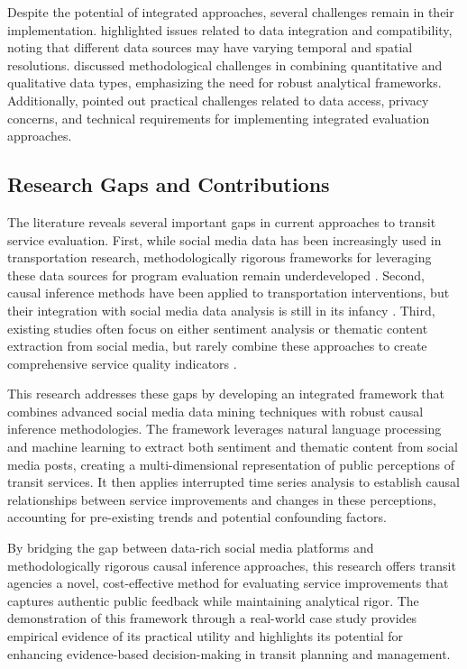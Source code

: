 \documentclass[a4paper,fleqn,12pt]{cas-sc}
\begin{document}
Despite the potential of integrated approaches, several challenges remain in their implementation. \cite{tse2018social} highlighted issues related to data integration and compatibility, noting that different data sources may have varying temporal and spatial resolutions. \cite{nguyen2016transportation} discussed methodological challenges in combining quantitative and qualitative data types, emphasizing the need for robust analytical frameworks. Additionally, \cite{zhang2019examining} pointed out practical challenges related to data access, privacy concerns, and technical requirements for implementing integrated evaluation approaches.

\subsection{Research Gaps and Contributions}
The literature reveals several important gaps in current approaches to transit service evaluation. First, while social media data has been increasingly used in transportation research, methodologically rigorous frameworks for leveraging these data sources for program evaluation remain underdeveloped \citep{schweitzer2012social, zhang2019examining}. Second, causal inference methods have been applied to transportation interventions, but their integration with social media data analysis is still in its infancy \citep{hong2020causal, ye2020causal}. Third, existing studies often focus on either sentiment analysis or thematic content extraction from social media, but rarely combine these approaches to create comprehensive service quality indicators \citep{collins2013social, luong2015mining}.

This research addresses these gaps by developing an integrated framework that combines advanced social media data mining techniques with robust causal inference methodologies. The framework leverages natural language processing and machine learning to extract both sentiment and thematic content from social media posts, creating a multi-dimensional representation of public perceptions of transit services. It then applies interrupted time series analysis to establish causal relationships between service improvements and changes in these perceptions, accounting for pre-existing trends and potential confounding factors.

By bridging the gap between data-rich social media platforms and methodologically rigorous causal inference approaches, this research offers transit agencies a novel, cost-effective method for evaluating service improvements that captures authentic public feedback while maintaining analytical rigor. The demonstration of this framework through a real-world case study provides empirical evidence of its practical utility and highlights its potential for enhancing evidence-based decision-making in transit planning and management.
\end{document}
